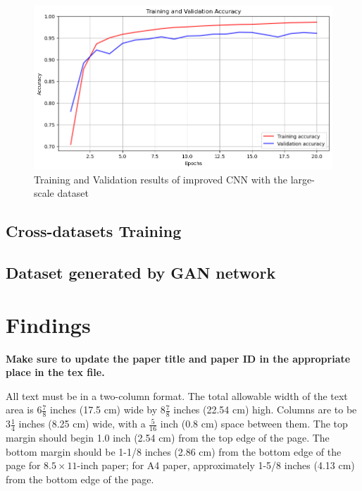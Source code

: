 \documentclass[final]{cvpr}
\begin{document}
\begin{figure}[t]
   \centering
   \includegraphics[width=0.9\linewidth]{img/ex-d2-improvedcnn-accuracy-results.png}
   \caption{Training and Validation results of improved CNN with the large-scale dataset}
   \label{fig:ex-d2-improvedcnn-results}
\end{figure}



\subsection{Cross-datasets Training}



\subsection{Dataset generated by GAN network}

\section{Findings}

{\bf Make sure to update the paper title and paper ID in the appropriate place in the tex file.}

All text must be in a two-column format. The total allowable width of the text
area is $6\frac78$ inches (17.5 cm) wide by $8\frac78$ inches (22.54 cm) high.
Columns are to be $3\frac14$ inches (8.25 cm) wide, with a $\frac{5}{16}$ inch
(0.8 cm) space between them. The top margin should begin
1.0 inch (2.54 cm) from the top edge of the page.  The bottom margin should be
1-1/8 inches (2.86 cm) from the bottom edge of the page for $8.5 \times
11$-inch paper; for A4 paper, approximately 1-5/8 inches (4.13 cm) from the
bottom edge of the page.
\end{document}
